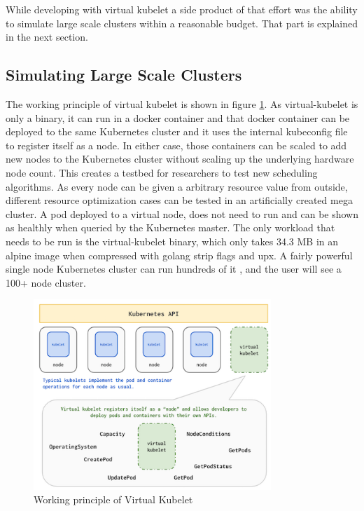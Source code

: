 While developing with virtual kubelet a side product of that effort was the ability to simulate large scale clusters within a reasonable budget. That part is explained in the next section.
\subsection{Simulating Large Scale Clusters}
The working principle of virtual kubelet is shown in figure \ref{fig:vk}. As virtual-kubelet is only a binary, it can run in a docker container and that docker container can be deployed to the same Kubernetes cluster and it uses the internal kubeconfig file to register itself as a node. In either case, those containers can be scaled to add new nodes to the Kubernetes cluster without scaling up the underlying hardware node count. This creates a testbed for researchers to test new scheduling algorithms. As every node can be given a arbitrary resource value from outside, different resource optimization cases can be tested in an artificially created mega cluster. A pod deployed to a virtual node, does not need to run and can be shown as healthly when queried by the Kubernetes master. The only workload that needs to be run is the virtual-kubelet binary, which only takes 34.3 MB in an alpine image when compressed with golang strip flags and upx. A fairly powerful single node Kubernetes cluster can run hundreds of it , and the user will see a 100+ node cluster.

\begin{figure}[htpb]
  \centering
  \includegraphics[width=0.8\textwidth]{figures/vk.png}
  \caption{Working principle of Virtual Kubelet \cite{virtual}} \label{fig:vk}
\end{figure}

